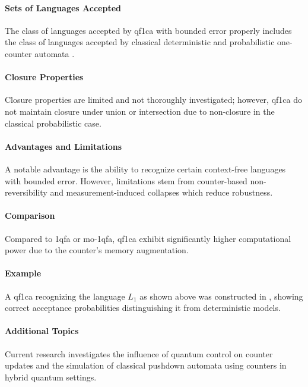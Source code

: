 \paragraph{Sets of Languages Accepted} 
The class of languages accepted by \gls{qf1ca} with bounded error properly includes the class of languages accepted by classical deterministic and probabilistic one-counter automata \cite{bonner2001quantum}.

\paragraph{Closure Properties} 
Closure properties are limited and not thoroughly investigated; however, \gls{qf1ca} do not maintain closure under union or intersection due to non-closure in the classical probabilistic case.

\paragraph{Advantages and Limitations} 
A notable advantage is the ability to recognize certain context-free languages with bounded error. However, limitations stem from counter-based non-reversibility and measurement-induced collapses which reduce robustness.

\paragraph{Comparison} 
Compared to \gls{1qfa} or \gls{mo-1qfa}, \gls{qf1ca} exhibit significantly higher computational power due to the counter's memory augmentation.

\paragraph{Example} 
A \gls{qf1ca} recognizing the language $L_1$ as shown above was constructed in \cite{bonner2001quantum}, showing correct acceptance probabilities distinguishing it from deterministic models.

\paragraph{Additional Topics} 
Current research investigates the influence of quantum control on counter updates and the simulation of classical pushdown automata using counters in hybrid quantum settings.


